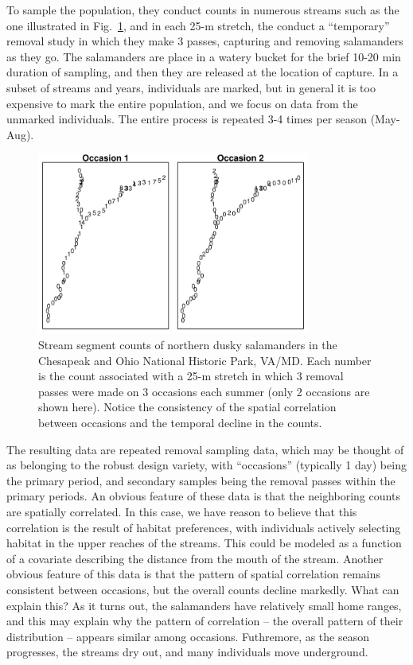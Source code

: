 To sample the population, they conduct counts in numerous streams such
as the one illustrated in Fig.~\ref{unmarked.fig.salct}, and in each
25-m stretch, the conduct a ``temporary'' removal study in which they
make 3 passes, capturing and removing salamanders as they go. The
salamanders are place in a watery bucket for the brief 10-20 min
duration of sampling, and then they are released at the location of
capture. In a subset of streams and years, individuals
are marked, but in general it is too expensive to mark the entire
population, and we focus on data from the unmarked individuals.
The entire process is repeated 3-4 times per season (May-Aug).

\begin{figure}
  \centering
  \includegraphics[width=0.8\textwidth]{Ch18-Unmarked/figs/saln27}
  \caption{Stream segment counts of northern dusky salamanders
    in the Chesapeak and Ohio National Historic Park,
    VA/MD. Each number is the count associated with a 25-m stretch in which 3 removal passes
    were made on 3 occasions each summer (only 2 occasions are shown
    here). Notice the consistency of the spatial correlation between
    occasions and the temporal decline in the counts.}
  \label{unmarked.fig.salct}
\end{figure}


The resulting data are repeated removal sampling data, which may be
thought of as belonging to the robust design variety, with
``occasions'' (typically 1 day) being the primary period, and
secondary samples being the removal passes within the primary
periods. An obvious feature of these data is that the neighboring
counts are spatially correlated. In this case, we have reason to
believe that this correlation is the result of habitat preferences,
with individuals actively selecting habitat in the upper reaches of
the streams. This could be modeled as a function of a covariate
describing the distance from the mouth of the stream. Another obvious
feature of this data is that the pattern of spatial correlation
remains consistent between occasions, but the overall counts decline
markedly. What can explain this? As it turns out, the salamanders have
relatively small home ranges, and this may explain why the pattern of
correlation -- the overall pattern of their distribution -- appears
similar among occasions. Futhremore, as the season progresses, the
streams dry out, and many individuals move underground.

